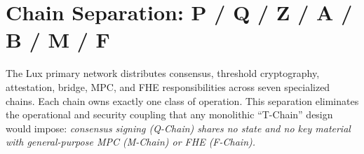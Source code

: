 \section{Chain Separation: P / Q / Z / A / B / M / F}

\label{sec:chain-sep}

The Lux primary network distributes consensus, threshold cryptography,
attestation, bridge, MPC, and FHE responsibilities across seven
specialized chains. Each chain owns exactly one class of operation. This
separation eliminates the operational and security coupling that any
monolithic ``T-Chain'' design would impose: \emph{consensus signing
(Q-Chain) shares no state and no key material with general-purpose MPC
(M-Chain) or FHE (F-Chain).}

